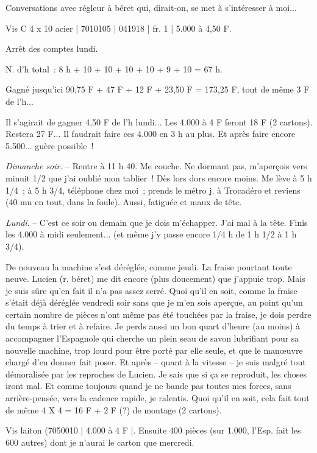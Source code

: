 \documentclass[french,twoside]{book} %
\begin{document}
\par
Conversations avec régleur à béret qui, dirait-on, se met à s'intéresser à moi...\par
Vis C 4 x 10 acier | 7010105 | 041918 | fr. 1 | 5.000 à 4,50 F.\par
Arrêt des comptes lundi.\par
N. d'h total : 8 h + 10 + 10 + 10 + 10 + 9 + 10 = 67 h.\par
Gagné jusqu'ici 90,75 F + 47 F + 12 F + 23,50 F = 173,25 F, tout de même 3 F de l'h...\par
Il s'agirait de gagner 4,50 F de l'h lundi... Les 4.000 à 4 F feront 18 F (2 cartons). Restera 27 F... Il faudrait faire ces 4.000 en 3 h au plus. Et après faire encore 5.500... guère possible !\par
{\itshape Dimanche soir}. – Rentre à 11 h 40. Me couche. Ne dormant pas, m'aperçois vers minuit 1/2 que j'ai oublié mon tablier ! Dès lors dors encore moins. Me lève à 5 h 1/4 ; à 5 h 3/4, téléphone chez moi ; prends le métro j. à Trocadéro et reviens (40 mn en tout, dans la foule). Aussi, fatiguée et maux de tête.\par
{\itshape Lundi}. – C'est ce soir ou demain que je dois m'échapper. J'ai mal à la tête. Finis les 4.000 à midi seulement... (et même j'y passe encore 1/4 h de 1 h 1/2 à 1 h 3/4).\par
De nouveau la machine s'est déréglée, comme jeudi. La fraise pourtant toute neuve. Lucien (r. béret) me dit encore (plus doucement) que j'appuie trop. Mais je suis sûre qu'en fait il n'a pas assez serré. Quoi qu'il en soit, comme la fraise s'était déjà déréglée vendredi soir sans que je m'en sois aperçue, au point qu'un certain nombre de pièces n'ont même pas été touchées par la fraise, je dois perdre du temps à trier et à refaire. Je perds aussi un bon quart d'heure (au moins) à accompagner l'Espagnole qui cherche un plein seau de savon lubrifiant pour sa nouvelle machine, trop lourd pour être porté par elle seule, et que le manœuvre chargé d'en donner fait poser. Et après – quant à la vitesse – je suis malgré tout démoralisée par les reproches de Lucien. Je sais que si ça se reproduit, les choses iront mal. Et comme toujours quand je ne bande pas toutes mes forces, sans arrière-pensée, vers la cadence rapide, je ralentis. Quoi qu'il en soit, cela fait tout de même 4 X 4 = 16 F + 2 F (?) de montage (2 cartons).\par
Vis laiton (7050010 | 4.000 à 4 F |. Ensuite 400 pièces (sur 1.000, l'Esp. fait les 600 autres) dont je n'aurai le carton que mercredi.\par
\end{document}
